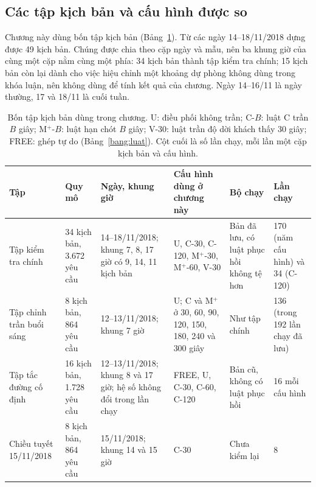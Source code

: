 \subsection{Các tập kịch bản và cấu hình được so}
\label{muc:c4-taptu}

Chương này dùng bốn tập kịch bản (Bảng~\ref{bang:c4-taptu}). Từ các ngày 14--18/11/2018 dựng được 49 kịch bản.
Chúng được chia theo cặp ngày và mẫu, nên ba khung giờ của cùng một cặp nằm cùng một phía: 34 kịch bản thành tập
kiểm tra chính; 15 kịch bản còn lại dành cho việc hiệu chỉnh một khoảng dự phòng không dùng trong khóa luận, nên không
dùng để tính kết quả của chương. Ngày 14--16/11 là ngày thường, 17 và 18/11 là cuối tuần.

\begin{table}[htbp]
\centering
\caption{Bốn tập kịch bản dùng trong chương. U: điều phối không trần; C-$B$: luật C trần $B$ giây;
M$^{+}$-$B$: luật hạn chót $B$ giây; V-30: luật trần độ dời khách thấy 30 giây; FREE: ghép tự do
(Bảng~\ref{bang:luat}). Cột cuối là số lần chạy, mỗi lần một cặp kịch bản và cấu hình.}
\label{bang:c4-taptu}
\footnotesize
\setlength{\tabcolsep}{3pt}
\begin{tabular}{@{}p{2.5cm}p{1.9cm}p{3.1cm}p{3.0cm}p{2.6cm}p{1.9cm}@{}}
\toprule
\textbf{Tập} & \textbf{Quy mô} & \textbf{Ngày, khung giờ} & \textbf{Cấu hình dùng ở chương này} &
\textbf{Bộ chạy} & \textbf{Lần chạy}\\
\midrule
Tập kiểm tra chính & 34 kịch bản, 3.672 yêu cầu & 14--18/11/2018; khung 7, 8, 17 giờ có 9, 14, 11
kịch bản & U, C-30, C-120, M$^{+}$-30, M$^{+}$-60, V-30 & Bản đã lưu, có luật phục hồi không tệ hơn &
170 (năm cấu hình) và 34 (C-120)\\
Tập chỉnh trần buổi sáng & 8 kịch bản, 864 yêu cầu & 12--13/11/2018; khung 7 giờ & U; C và M$^{+}$ ở 30, 60,
90, 120, 150, 180, 240 và 300 giây & Như tập chính & 136 (trong 192 lần chạy đã lưu)\\
Tập tắc đường cố định & 16 kịch bản, 1.728 yêu cầu & 12--13/11/2018; khung 8 và 17 giờ; hệ số không
đổi trong lần chạy & FREE, U, C-30, C-60, C-120 & Bản cũ, không có luật phục hồi & 16 mỗi cấu hình\\
Chiều tuyết 15/11/2018 & 8 kịch bản, 864 yêu cầu & 15/11/2018; khung 14 và 15 giờ & C-30 &
Chưa kiểm lại & 8\\
\bottomrule
\end{tabular}
\end{table}


